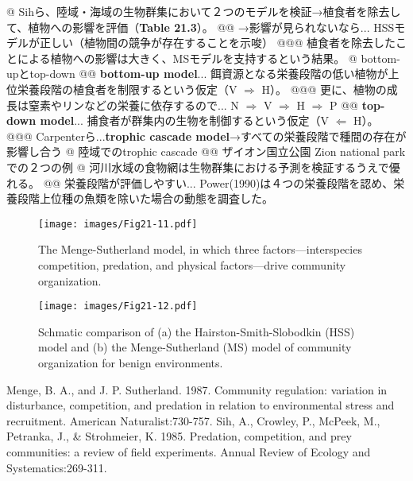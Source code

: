 \documentclass[12pt, report, a4paper]{jsbook}
\newcommand{\xAlert}[1]{{\textbf{\textcolor[cmyk]{1, 0.50, 0, 0}{#1}}}}
\begin{document}
\begin{easylist}[itemize]
@ Sihら\cite{Sih:1985}、陸域・海域の生物群集において２つのモデルを検証→植食者を除去して、植物への影響を評価（\textbf{Table 21.3}）。
@@ →影響が見られないなら... HSSモデルが正しい（植物間の競争が存在することを示唆）
@@@ 植食者を除去したことによる植物への影響は大きく、MSモデルを支持するという結果。
@ bottom-upとtop-down
@@ \xAlert{bottom-up model}... 餌資源となる栄養段階の低い植物が上位栄養段階の植食者を制限するという仮定（V $\Rightarrow$ H）。
@@@ 更に、植物の成長は窒素やリンなどの栄養に依存するので... N $\Rightarrow$ V $\Rightarrow$ H $\Rightarrow$ P
@@ \xAlert{top-down model}... 捕食者が群集内の生物を制御するという仮定（V $\Leftarrow$ H）。
@@@ Carpenterら...\xAlert{trophic cascade model}→すべての栄養段階で種間の存在が影響し合う 
@ 陸域でのtrophic cascade
@@ ザイオン国立公園 Zion national parkでの２つの例
@ 河川水域の食物網は生物群集における予測を検証するうえで優れる。
@@ 栄養段階が評価しやすい... Power(1990)は４つの栄養段階を認め、栄養段階上位種の魚類を除いた場合の動態を調査した。
\end{easylist}

\begin{figure}
\texttt{[image: images/Fig21-11.pdf]}
\renewcommand{\baselinestretch}{1.2}
\caption[The Menge-Sutherland model]{The Menge-Sutherland model, in which three factors—interspecies competition, predation, and physical factors—drive community organization.}
\end{figure}

\begin{figure}
\texttt{[image: images/Fig21-12.pdf]}
\renewcommand{\baselinestretch}{1.2}
\caption{Schmatic comparison of (a) the Hairston-Smith-Slobodkin (HSS) model and (b) the Menge-Sutherland (MS) model of community organization for benign environments.}
\end{figure}

\begin{thebibliography}{99}
Menge, B. A., and J. P. Sutherland. 1987. Community regulation: variation in disturbance, competition, and predation in relation to environmental stress and recruitment. American Naturalist:730-757.
Sih, A., Crowley, P., McPeek, M., Petranka, J., \& Strohmeier, K. 1985. Predation, competition, and prey communities: a review of field experiments. Annual Review of Ecology and Systematics:269-311.

\end{thebibliography}
\end{document}
